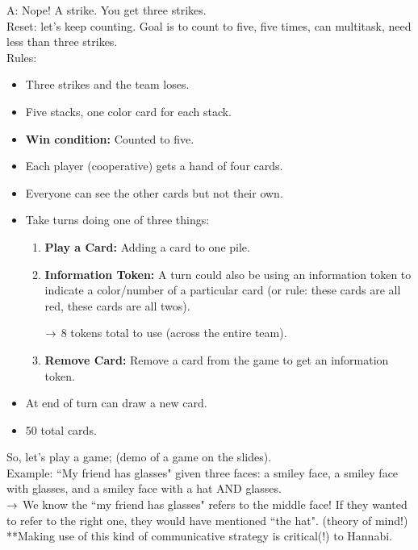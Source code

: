 A: Nope! A strike. You get three strikes. \\

Reset: let's keep counting. Goal is to count to five, five times, can multitask, need less than three strikes. \\

Rules:
\begin{itemize}
    \item Three strikes and the team loses.
    \item Five stacks, one color card for each stack.
    \item {\bf Win condition:} Counted to five.
    \item Each player (cooperative) gets a hand of four cards.
    \item Everyone can see the other cards but not their own.
    \item Take turns doing one of three things:
    \begin{enumerate}
        \item {\bf Play a Card:} Adding a card to one pile.
        \item {\bf Information Token:} A turn could also be using an information token to indicate a color/number of a particular card (or rule: these cards are all red, these cards are all twos).
    
        $\rightarrow$ 8 tokens total to use (across the entire team).
    
        \item {\bf Remove Card:} Remove a card from the game to get an information token.
    \end{enumerate}
    \item At end of turn can draw a new card.
    \item 50 total cards.

\end{itemize}

So, let's play a game; (demo of a game on the slides). \\


Example: ``My friend has glasses" given three faces: a smiley face, a smiley face with glasses, and a smiley face with a hat AND glasses. \\

$\rightarrow$ We know the ``my friend has glasses" refers to the middle face! If they wanted to refer to the right one, they would have mentioned ``the hat". (theory of mind!) \\

**Making use of this kind of communicative strategy is critical(!) to Hannabi. \\

